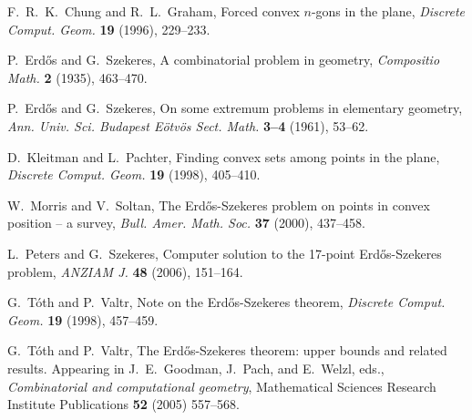\documentclass[12pt]{article}
\begin{document}
\begin{thebibliography}{9}
F.~R.~K.~Chung and R.~L.~Graham, Forced convex $n$-gons in the plane, {\it Discrete Comput. Geom.} {\bf 19} (1996), 229--233.

P.~Erd\H{o}s and G.~Szekeres, A combinatorial problem in geometry, {\it Compositio Math.} {\bf 2} (1935), 463--470.

P.~Erd\H{o}s and G.~Szekeres, On some extremum problems in elementary geometry, {\it Ann. Univ. Sci. Budapest E\"otv\"os Sect. Math.} {\bf 3--4} (1961), 53--62.

D.~Kleitman and L.~Pachter, Finding convex sets among points in the plane, {\it Discrete Comput. Geom.} {\bf 19} (1998), 405--410.

W.~Morris and V.~Soltan, The Erd\H{o}s-Szekeres problem on points in convex position -- a survey, {\it Bull. Amer. Math. Soc.} {\bf 37} (2000), 437--458.

L.~Peters and G.~Szekeres, Computer solution to the 17-point Erd\H{o}s-Szekeres problem, {\it ANZIAM J.} {\bf 48} (2006), 151--164.

G.~T\'{o}th and P.~Valtr, Note on the Erd\H{o}s-Szekeres theorem, {\it Discrete Comput. Geom.} {\bf 19} (1998), 457--459.

G.~T\'{o}th and P.~Valtr, The Erd\H{o}s-Szekeres theorem: upper bounds and related results. Appearing in J.~E.~Goodman, J.~Pach, and E.~Welzl, eds., {\it Combinatorial and computational geometry}, Mathematical Sciences Research Institute Publications {\bf 52} (2005) 557--568.
\end{thebibliography}
\end{document}

